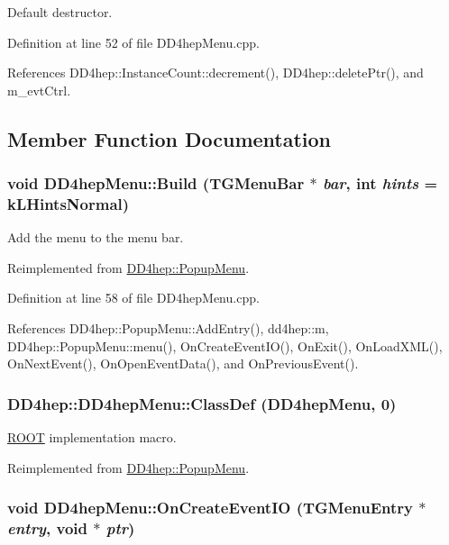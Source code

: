 Default destructor. 

Definition at line 52 of file DD4hepMenu.cpp.

References DD4hep::InstanceCount::decrement(), DD4hep::deletePtr(), and m\_\-evtCtrl.

\subsection{Member Function Documentation}
\hypertarget{class_d_d4hep_1_1_d_d4hep_menu_a85d08c3fd89b740586c592797e780607}{
\subsubsection[{Build}]{\setlength{\rightskip}{0pt plus 5cm}void DD4hepMenu::Build (TGMenuBar $\ast$ {\em bar}, \/  int {\em hints} = {\ttfamily kLHintsNormal})}}
\label{class_d_d4hep_1_1_d_d4hep_menu_a85d08c3fd89b740586c592797e780607}


Add the menu to the menu bar. 

Reimplemented from \hyperlink{class_d_d4hep_1_1_popup_menu_a896a1626d79fd3d6ccb1c1e0657cf1ae}{DD4hep::PopupMenu}.

Definition at line 58 of file DD4hepMenu.cpp.

References DD4hep::PopupMenu::AddEntry(), dd4hep::m, DD4hep::PopupMenu::menu(), OnCreateEventIO(), OnExit(), OnLoadXML(), OnNextEvent(), OnOpenEventData(), and OnPreviousEvent().\hypertarget{class_d_d4hep_1_1_d_d4hep_menu_af3b9cf3c445924532b16883e46833624}{
\subsubsection[{ClassDef}]{\setlength{\rightskip}{0pt plus 5cm}DD4hep::DD4hepMenu::ClassDef ({\bf DD4hepMenu}, \/  0)}}
\label{class_d_d4hep_1_1_d_d4hep_menu_af3b9cf3c445924532b16883e46833624}


\hyperlink{namespace_r_o_o_t}{ROOT} implementation macro. 

Reimplemented from \hyperlink{class_d_d4hep_1_1_popup_menu_a8ffb8033e698baa49a05c79c66e0f5c2}{DD4hep::PopupMenu}.\hypertarget{class_d_d4hep_1_1_d_d4hep_menu_a560b5e3a05e4d3ef571fa876ac1dcdd2}{
\subsubsection[{OnCreateEventIO}]{\setlength{\rightskip}{0pt plus 5cm}void DD4hepMenu::OnCreateEventIO (TGMenuEntry $\ast$ {\em entry}, \/  void $\ast$ {\em ptr})}}
\label{class_d_d4hep_1_1_d_d4hep_menu_a560b5e3a05e4d3ef571fa876ac1dcdd2}


